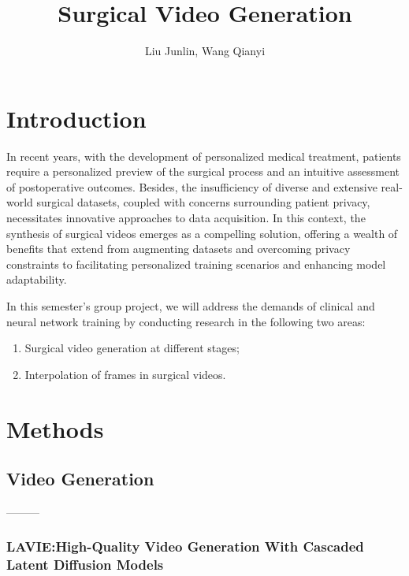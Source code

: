 \documentclass[lettersize,journal]{IEEEtran}
\author{Liu Junlin, Wang Qianyi}
\title{Surgical Video Generation}
\begin{document}
  \maketitle
  
  \section{Introduction}
  
    In recent years, with the development of personalized medical treatment, patients require a personalized preview of the surgical process and an intuitive assessment of postoperative outcomes. Besides, the insufficiency of diverse and extensive real-world surgical datasets, coupled with concerns surrounding patient privacy, necessitates innovative approaches to data acquisition. In this context, the synthesis of surgical videos emerges as a compelling solution, offering a wealth of benefits that extend from augmenting datasets and overcoming privacy constraints to facilitating personalized training scenarios and enhancing model adaptability. 
  
    In this semester's group project, we will address the demands of clinical and neural network training by conducting research in the following two areas:
    
    \begin{enumerate}
        \item Surgical video generation at different stages;
        \item Interpolation of frames in surgical videos.
    \end{enumerate}

\section{Methods}

\subsection{Video Generation}
---------

\subsubsection{LAVIE:High-Quality Video Generation With Cascaded Latent Diffusion Models}
\end{document}
